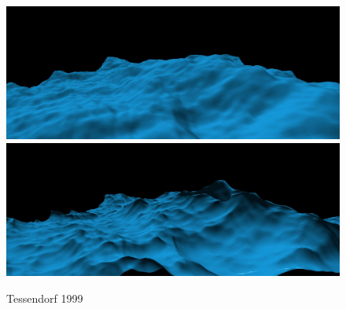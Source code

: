 






\begin{figure}
 \centering
 \subtop
 {
  \includegraphics[scale=0.125]{figures/Simulating_Ocean_Water-012.png}
 }
 \subtop
 {
  \includegraphics[scale=0.125]{figures/Simulating_Ocean_Water-013.png}
 }
 \caption{Tessendorf 1999}
\end{figure}

